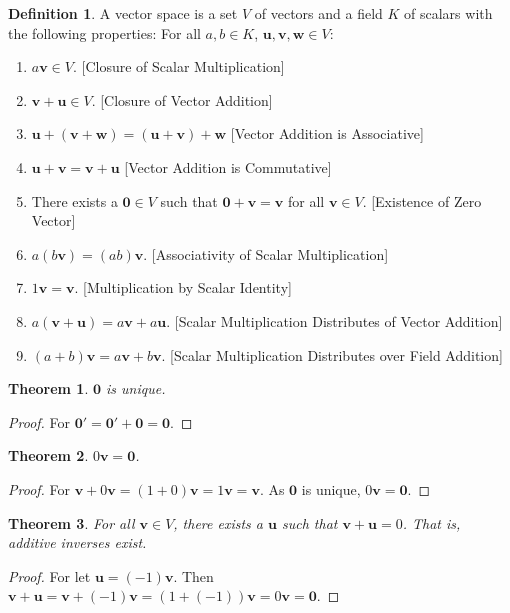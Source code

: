 \documentclass[oneside]{book}
\newtheorem{theorem}{Theorem}[section]
\theoremstyle{definition}
\newtheorem{definition}{Definition}[section]
\newcommand*\B[1]{\mathbf{#1}}
\begin{document}
\begin{definition}
A vector space is a set $V$ of vectors and a field $K$ of scalars with the following properties: For all $a,b\in K$, $\B{u,v,w}\in V$:
\begin{enumerate}
\item $a\B{v} \in V$. \hfill [Closure of Scalar Multiplication]
\item $\B{v}+\B{u} \in V$. \hfill [Closure of Vector Addition]
\item $\B{u}+(\B{v}+\B{w}) = (\B{u}+\B{v})+\B{w}$ \hfill [Vector Addition is Associative]
\item $\B{u}+\B{v}=\B{v}+\B{u}$ \hfill [Vector Addition is Commutative]
\item There exists a $\B{0}\in V$ such that $\B{0}+\B{v}=\B{v}$ for all $\B{v}\in V$. \hfill [Existence of Zero Vector]
\item $a(b\B{v}) = (ab)\B{v}$. \hfill [Associativity of Scalar Multiplication]
\item $1 \B{v} = \B{v}$. \hfill[Multiplication by Scalar Identity]
\item $a(\B{v}+\B{u}) = a\B{v}+a\B{u}$. \hfill [Scalar Multiplication Distributes of Vector Addition]
\item $(a+b)\B{v}= a\B{v}+b\B{v}$. \hfill [Scalar Multiplication Distributes over Field Addition]
\end{enumerate}
\end{definition}

\begin{theorem}
$\B{0}$ is unique.
\end{theorem}
\begin{proof}
For $\B{0}'=\B{0}'+\B{0}=\B{0}$.
\end{proof}

\begin{theorem}
$0\B{v} = \B{0}$.
\end{theorem}
\begin{proof}
For $\B{v}+0\B{v} = (1+0)\B{v} = 1\B{v} = \B{v}$. As $\B{0}$ is unique, $0\B{v}=\B{0}$.
\end{proof}

\begin{theorem}
For all $\B{v}\in V$, there exists a $\B{u}$ such that $\B{v}+\B{u}=0$. That is, additive inverses exist.
\end{theorem}
\begin{proof}
For let $\B{u} = (-1)\B{v}$. Then $\B{v}+\B{u} = \B{v}+(-1)\B{v} = (1+(-1))\B{v} = 0\B{v} = \B{0}$.
\end{proof}
\end{document}
